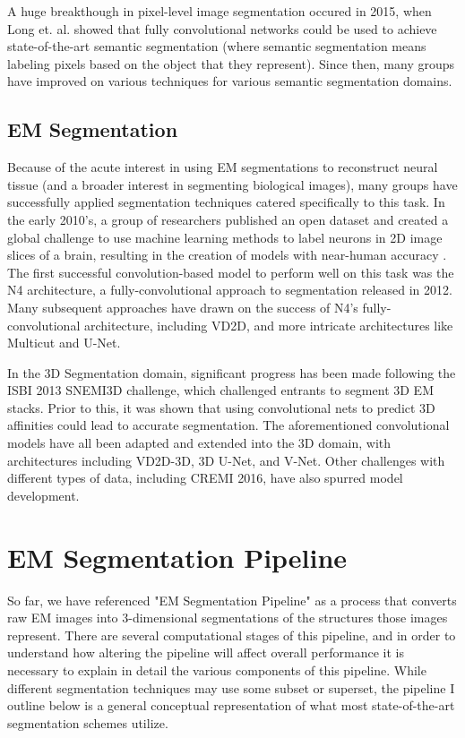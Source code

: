 A huge breakthough in pixel-level image segmentation occured in 2015, when Long et. al. showed that fully convolutional networks could be used to achieve state-of-the-art semantic segmentation (where semantic segmentation means labeling pixels based on the object that they represent)\cite{Long2014}. Since then, many groups have improved on various techniques for various semantic segmentation domains\cite{Badrinarayanan2015}.

\subsection{EM Segmentation}

Because of the acute interest in using EM segmentations to reconstruct neural tissue (and a broader interest in segmenting biological images), many groups have successfully applied segmentation techniques catered specifically to this task. In the early 2010's, a group of researchers published an open dataset and created a global challenge to use machine learning methods to label neurons in 2D image slices of a brain, resulting in the creation of models with near-human accuracy \cite{Arganda-Carreras2015}. The first successful convolution-based model to perform well on this task was the N4 architecture, a fully-convolutional approach to segmentation released in 2012\cite{Cirean}. Many subsequent approaches have drawn on the success of N4's fully-convolutional architecture, including VD2D, and more intricate architectures like Multicut and U-Net\cite{Beier2017,Ronneberger2015}.

In the 3D Segmentation domain, significant progress has been made following the ISBI 2013 SNEMI3D challenge\cite{Arganda-Carreras2013}, which challenged entrants to segment 3D EM stacks. Prior to this, it was shown that using convolutional nets to predict 3D affinities could lead to accurate segmentation\cite{Turaga2010}. The aforementioned convolutional models have all been adapted and extended into the 3D domain, with architectures including VD2D-3D\cite{Lee}, 3D U-Net\cite{Cicek2016}, and V-Net\cite{Milletari2016}. Other challenges with different types of data, including CREMI 2016, have also spurred model development\cite{Funke.Jan2016}.

\section{EM Segmentation Pipeline}

So far, we have referenced "EM Segmentation Pipeline" as a process that converts raw EM images into 3-dimensional segmentations of the structures those images represent. There are several computational stages of this pipeline, and in order to understand how altering the pipeline will affect overall performance it is necessary to explain in detail the various components of this pipeline. While different segmentation techniques may use some subset or superset, the pipeline I outline below is a general conceptual representation of what most state-of-the-art segmentation schemes utilize. 

